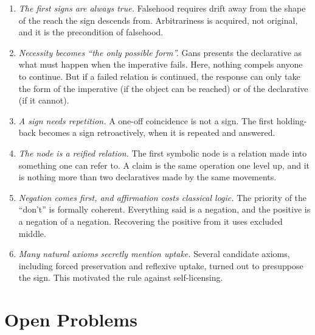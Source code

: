 \documentclass[11pt]{article}
\begin{document}
\begin{enumerate}
    lost.
  \item \emph{The first signs are always true.} Falsehood requires drift away from the shape
    of the reach the sign descends from. Arbitrariness is acquired, not original, and it is
    the precondition of falsehood.
  \item \emph{Necessity becomes ``the only possible form''.} Gans presents the declarative
    as what must happen when the imperative fails. Here, nothing compels anyone to continue.
    But if a failed relation is continued, the response can only take the form of the
    imperative (if the object can be reached) or of the declarative (if it cannot).
  \item \emph{A sign needs repetition.} A one-off coincidence is not a sign. The first
    holding-back becomes a sign retroactively, when it is repeated and answered.
  \item \emph{The node is a reified relation.} The first symbolic node is a relation made
    into something one can refer to. A claim is the same operation one level up, and it is
    nothing more than two declaratives made by the same movements.
  \item \emph{Negation comes first, and affirmation costs classical logic.} The priority of
    the ``don't'' is formally coherent. Everything said is a negation, and the positive is
    a negation of a negation. Recovering the positive from it uses excluded middle.
  \item \emph{Many natural axioms secretly mention uptake.} Several candidate axioms,
    including forced preservation and reflexive uptake, turned out to presuppose the sign.
    This motivated the rule against self-licensing.
\end{enumerate}

\section{Open Problems}
\end{document}
